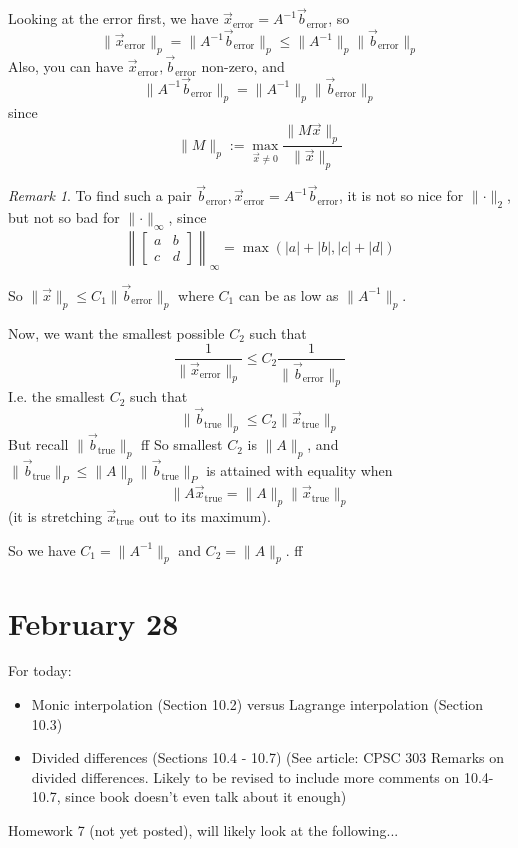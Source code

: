 \documentclass{article}
\theoremstyle{plain}
\theoremstyle{remark}
\newtheorem{remark}{Remark}
\begin{document}
Looking at the error first, we have $\vec{x}_{\text{error}} = A^{-1} \vec{b}_{\text{error}}$, so
\[
	\lVert \vec{x}_{\text{error}} \rVert_p = \lVert A^{-1} \vec{b}_{\text{error}} \rVert_p
	\leq \lVert A^{-1} \rVert_p \lVert \vec{b}_{\text{error}}\rVert_p
\]
Also, you can have $\vec{x}_{\text{error}},\vec{b}_{\text{error}}$ non-zero, and
\[
	\lVert A^{-1} \vec{b}_{\text{error}} \rVert_p
	= \lVert A^{-1} \rVert_p \lVert \vec{b}_{\text{error}}\rVert_p
\]
since
\[
	\lVert M \rVert_p := \max_{\vec{x} \neq 0} \frac{\lVert M\vec{x}\rVert_p}
	{\lVert \vec{x} \rVert_p}
\]
\begin{remark}
	To find such a pair $\vec{b}_{\text{error}}, \vec{x}_{\text{error}}
	= A^{-1} \vec{b}_{\text{error}}$,
	it is not so nice for $\lVert \cdot \rVert_2$,
	but not so bad for $\lVert \cdot \rVert_\infty$,
	since
	\[
		\left\lVert \begin{bmatrix} a & b \\ c & d \end{bmatrix} \right\rVert_\infty
		= \max(|a| + |b|, |c| + |d|)
	\]
\end{remark}
So $\lVert \vec{x} \rVert_p \leq C_1 \lVert \vec{b}_{\text{error}} \rVert_p$
where $C_1$ can be as low as $\lVert A^{-1} \rVert_p$.

Now, we want the smallest possible $C_2$ such that
\[
	\frac{1}{\lVert \vec{x}_{\text{error}} \rVert_p} \leq C_2
	\frac{1}{\lVert \vec{b}_{\text{error}} \rVert_p}
\]
I.e. the smallest $C_2$ such that
\[
	\lVert \vec{b}_{\text{true}} \rVert_p \leq C_2 \lVert \vec{x}_{\text{true}} \rVert_p
\]
But recall $\lVert \vec{b}_{\text{true}} \rVert_p$ ff
So smallest $C_2$ is $\lVert A \rVert_p$, and
$\lVert \vec{b}_{\text{true}} \rVert_P \leq \lVert A \rVert_p
\lVert \vec{b}_{\text{true}} \rVert_P$
is attained with equality when
\[
	\lVert A \vec{x}_{\text{true}} = \lVert A \rVert_p \lVert \vec{x}_{\text{true}}\rVert_p
\]
(it is stretching $\vec{x}_{\text{true}}$ out to its maximum).

So we have $C_1 = \lVert A^{-1} \rVert_p$ and $C_2 = \lVert A \rVert_p$.
ff


\section{February 28}
For today:
\begin{itemize}
	\item Monic interpolation (Section 10.2) versus Lagrange interpolation (Section 10.3)
	\item Divided differences (Sections 10.4 - 10.7)
		(See article: CPSC 303 Remarks on divided differences.
		Likely to be revised to include more comments on 10.4-10.7,
		since book doesn't even talk about it enough)
\end{itemize}
Homework 7 (not yet posted),
will likely look at the following...
\end{document}
